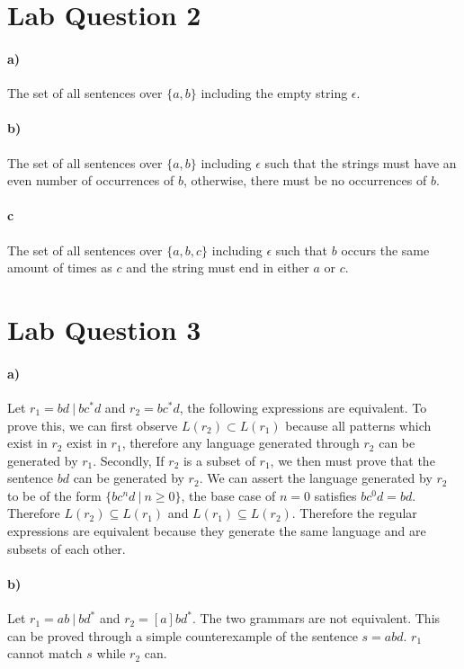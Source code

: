 \documentclass[12pt, letter]{article}
\begin{document}
	\section*{Lab Question 2}
	\paragraph*{a)}
	The set of all sentences over $\{a, b\}$ including the empty string $\epsilon$.
	\paragraph*{b)}
	The set of all sentences over $\{a, b\}$ including $\epsilon$ such that the strings must have an even number of occurrences of $b$, otherwise, there must be no occurrences of $b$.
	\paragraph*{c}
	The set of all sentences over $\{a, b, c\}$ including $\epsilon$ such that $b$ occurs the same amount of times as $c$ and the string must end in either $a$ or $c$.
	\section*{Lab Question 3}
	\paragraph*{a)}
	Let $r_1 = bd\ |\ bc^*d$ and $r_2 = bc^*d$, the following expressions are equivalent. To prove this, we can first observe $L(r_2) \subset L(r_1)$ because all patterns which exist in $r_2$ exist in $r_1$, therefore any language generated through $r_2$ can be generated by $r_1$. Secondly, If $r_2$ is a subset of $r_1$, we then must prove that the sentence $bd$ can be generated by $r_2$. We can assert the language generated by $r_2$ to be of the form $\{bc^nd\ |\ n \geq 0\}$, the base case of $n = 0$ satisfies $bc^0d = bd$. Therefore $L(r_2) \subseteq L(r_1)$ and $L(r_1) \subseteq L(r_2)$. Therefore the regular expressions are equivalent because they generate the same language and are subsets of each other.
	
	\paragraph{b)} 
	Let $r_1 = ab\ |\ bd^*$ and $r_2 = [a]bd^*$. The two grammars are not equivalent. This can be proved through a simple counterexample of the sentence $s = abd$. $r_1$ cannot match $s$ while $r_2$ can.
	
\end{document}
